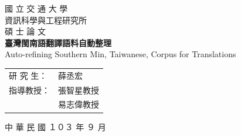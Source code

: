 \documentclass[final,oneside,onecolumn,12pt,a4paper]{book}%
\begin{document}
\begin{titlepage}

\begin{center}

   

\textsc{\Huge 國 立 交 通 大 學} %
\\[2em]
\textsc{\LARGE 資訊科學與工程研究所} %
\\[2em]
\textsc{\LARGE 碩 士 論 文} %
\\[3em]

{\huge \bfseries 臺灣閩南語翻譯語料自動整理 } %
\\[1em]
{\LARGE Auto-refining Southern Min, Taiwanese, Corpus for Translations}
\\[3em]

\begin{table}[H]
\centering
\Large
\begin{tabular}{ll}
研 究 生： & 薛丞宏\\ %
指導教授： & 張智星教授\\ %
 & 易志偉教授\\ %
\end{tabular}
\end{table}

\vfill

{\large 中 華 民 國  １０３  年  ９  月}

\end{center}

\end{titlepage}


\frontmatter
\end{document}
